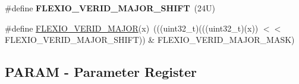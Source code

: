 \begin{DoxyCompactItemize}
\item 
\mbox{\label{group___f_l_e_x_i_o___register___masks_ga098abbc359a7c20fe2dacb07aaaf4a97}} 
\#define {\bfseries F\+L\+E\+X\+I\+O\+\_\+\+V\+E\+R\+I\+D\+\_\+\+M\+A\+J\+O\+R\+\_\+\+S\+H\+I\+FT}~(24\+U)
\item 
\#define \mbox{\hyperlink{group___f_l_e_x_i_o___register___masks_gac66c75c1e306284aada80aa12fd3a38d}{F\+L\+E\+X\+I\+O\+\_\+\+V\+E\+R\+I\+D\+\_\+\+M\+A\+J\+OR}}(x)~(((uint32\+\_\+t)(((uint32\+\_\+t)(x)) $<$$<$ F\+L\+E\+X\+I\+O\+\_\+\+V\+E\+R\+I\+D\+\_\+\+M\+A\+J\+O\+R\+\_\+\+S\+H\+I\+FT)) \& F\+L\+E\+X\+I\+O\+\_\+\+V\+E\+R\+I\+D\+\_\+\+M\+A\+J\+O\+R\+\_\+\+M\+A\+SK)
\end{DoxyCompactItemize}
\subsection*{P\+A\+R\+AM -\/ Parameter Register}
